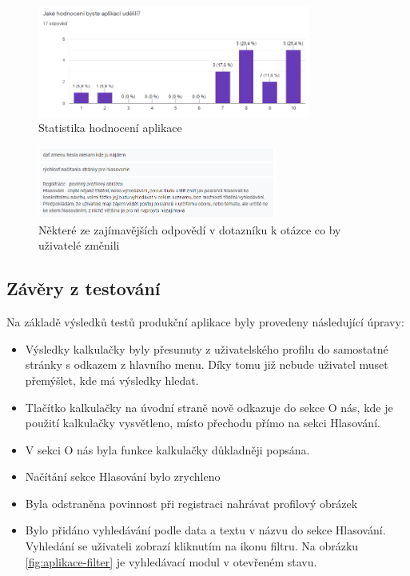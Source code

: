 \begin{figure}
    \centering
    \includegraphics[width=0.8\textwidth]{obrazky-figures/dotaznik-hodnoceni.png}
    \caption{Statistika hodnocení aplikace}
    \label{fig:dotaznik-hodnoceni}
\end{figure}

\begin{figure}
    \centering
    \includegraphics[width=0.7\textwidth]{obrazky-figures/dotaznik-zmeny.png}
    \caption{Některé ze zajímavějších odpovědí v dotazníku k otázce co by uživatelé změnili}
    \label{fig:dotaznik-zmeny}
\end{figure}

\subsection{Závěry z testování} 
Na základě výsledků testů produkční aplikace byly provedeny následující úpravy: 
\begin{itemize}
    \item Výsledky kalkulačky byly přesunuty z uživatelského profilu do samostatné stránky s odkazem z hlavního menu. Díky tomu již nebude uživatel muset přemýšlet, kde má výsledky hledat. \item Tlačítko kalkulačky na úvodní straně nově odkazuje do sekce O nás, kde je použití kalkulačky vysvětleno, místo přechodu přímo na sekci Hlasování.
    \item V sekci O nás byla funkce kalkulačky důkladněji popsána.
    \item Načítání sekce Hlasování bylo zrychleno
    \item Byla odstraněna povinnost při registraci nahrávat profilový obrázek
    \item Bylo přidáno vyhledávání podle data a textu v názvu do sekce Hlasování. Vyhledání se uživateli zobrazí kliknutím na ikonu filtru. Na obrázku \ref{fig:aplikace-filter} je vyhledávací modul v otevřeném stavu.
\end{itemize}


